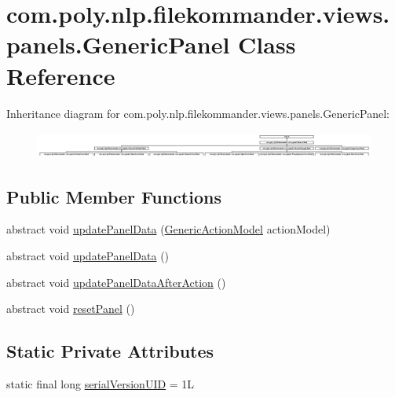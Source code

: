 \hypertarget{classcom_1_1poly_1_1nlp_1_1filekommander_1_1views_1_1panels_1_1_generic_panel}{\section{com.\-poly.\-nlp.\-filekommander.\-views.\-panels.\-Generic\-Panel Class Reference}
\label{classcom_1_1poly_1_1nlp_1_1filekommander_1_1views_1_1panels_1_1_generic_panel}
}
Inheritance diagram for com.\-poly.\-nlp.\-filekommander.\-views.\-panels.\-Generic\-Panel\-:\begin{figure}[H]
\begin{center}
\leavevmode
\includegraphics[height=0.884676cm]{classcom_1_1poly_1_1nlp_1_1filekommander_1_1views_1_1panels_1_1_generic_panel}
\end{center}
\end{figure}
\subsection*{Public Member Functions}
\begin{DoxyCompactItemize}
\item 
abstract void \hyperlink{classcom_1_1poly_1_1nlp_1_1filekommander_1_1views_1_1panels_1_1_generic_panel_aec26b991510d51ae77eb19bf6e7855f7}{update\-Panel\-Data} (\hyperlink{interfacecom_1_1poly_1_1nlp_1_1filekommander_1_1views_1_1models_1_1_generic_action_model}{Generic\-Action\-Model} action\-Model)
\item 
abstract void \hyperlink{classcom_1_1poly_1_1nlp_1_1filekommander_1_1views_1_1panels_1_1_generic_panel_aa001c8d88eccb61c64ad0d3b0d296648}{update\-Panel\-Data} ()
\item 
abstract void \hyperlink{classcom_1_1poly_1_1nlp_1_1filekommander_1_1views_1_1panels_1_1_generic_panel_aacbeeee52c7652d69d95879cb713936d}{update\-Panel\-Data\-After\-Action} ()
\item 
abstract void \hyperlink{classcom_1_1poly_1_1nlp_1_1filekommander_1_1views_1_1panels_1_1_generic_panel_ae70ee89c98b042bbe57cb45e9a79816f}{reset\-Panel} ()
\end{DoxyCompactItemize}
\subsection*{Static Private Attributes}
\begin{DoxyCompactItemize}
\item 
static final long \hyperlink{classcom_1_1poly_1_1nlp_1_1filekommander_1_1views_1_1panels_1_1_generic_panel_ac3f7f05bbdfeb29c6d8dd1eebfbda726}{serial\-Version\-U\-I\-D} = 1\-L
\end{DoxyCompactItemize}


